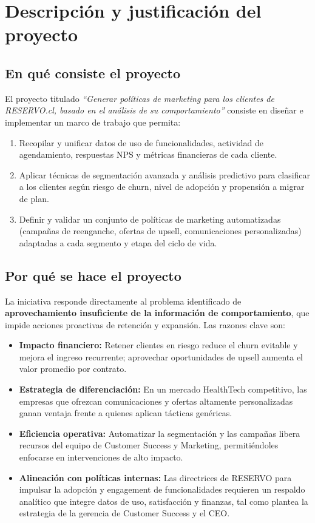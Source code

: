 \section{Descripción y justificación del proyecto}
\subsection{En qué consiste el proyecto}

El proyecto titulado \emph{“Generar políticas de marketing para los clientes de RESERVO.cl, basado en el análisis de su comportamiento”} consiste en diseñar e implementar un marco de trabajo que permita:
\begin{enumerate}
  \item Recopilar y unificar datos de uso de funcionalidades, actividad de agendamiento, respuestas NPS y métricas financieras de cada cliente.
  \item Aplicar técnicas de segmentación avanzada y análisis predictivo para clasificar a los clientes según riesgo de churn, nivel de adopción y propensión a migrar de plan.
  \item Definir y validar un conjunto de políticas de marketing automatizadas (campañas de reenganche, ofertas de upsell, comunicaciones personalizadas) adaptadas a cada segmento y etapa del ciclo de vida.
\end{enumerate}

\subsection{Por qué se hace el proyecto}
La iniciativa responde directamente al problema identificado de \textbf{aprovechamiento insuficiente de la información de comportamiento}, que impide acciones proactivas de retención y expansión. Las razones clave son:
\begin{itemize}
  \item \textbf{Impacto financiero:} Retener clientes en riesgo reduce el churn evitable y mejora el ingreso recurrente; aprovechar oportunidades de upsell aumenta el valor promedio por contrato.
  \item \textbf{Estrategia de diferenciación:} En un mercado HealthTech competitivo, las empresas que ofrezcan comunicaciones y ofertas altamente personalizadas ganan ventaja frente a quienes aplican tácticas genéricas.
  \item \textbf{Eficiencia operativa:} Automatizar la segmentación y las campañas libera recursos del equipo de Customer Success y Marketing, permitiéndoles enfocarse en intervenciones de alto impacto.
  \item \textbf{Alineación con políticas internas:} Las directrices de RESERVO para impulsar la adopción y engagement de funcionalidades requieren un respaldo analítico que integre datos de uso, satisfacción y finanzas, tal como plantea la estrategia de la gerencia de Customer Success y el CEO.
\end{itemize}

